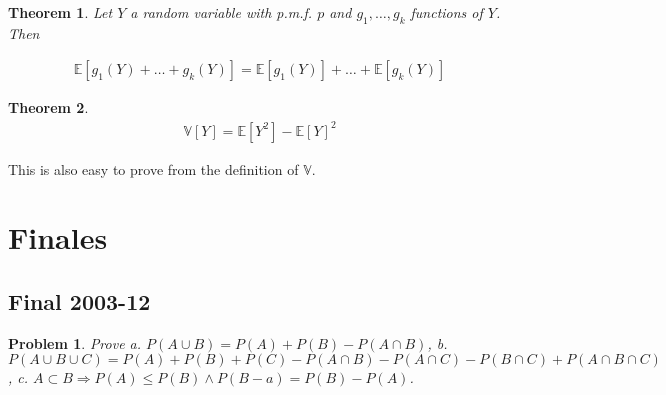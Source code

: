 \documentclass[a4paper, 12pt]{article}
\newtheorem{problem}{Problem}
\newtheorem{theorem}{Theorem}
\newtheorem{problem}{Problem}
\newtheorem{theorem}{Theorem}
\begin{document}
\begin{theorem}
    Let $Y$ a random variable with p.m.f. $p$ and $g_1, \ldots, g_k$ functions
    of $Y$. Then 

    \begin{align*}
        \mathbb{E} \left[ g_1(Y) + \ldots + g_k(Y) \right] = \mathbb{E}\left[
        g_1(Y) \right] + \ldots + \mathbb{E}\left[ g_k(Y) \right] 
    \end{align*}
\end{theorem}

\begin{theorem}
    \begin{align*}
    \mathbb{V}[Y] = \mathbb{E}[Y^2] - \mathbb{E}[Y]^2
    \end{align*}
\end{theorem}

This is also easy to prove from the definition of $\mathbb{V}$. 

\pagebreak

\section{Finales}

\subsection{Final 2003-12}

\begin{problem}
    Prove \textit{a.} $P(A \cup B) = P(A) + P(B) - P(A \cap B)$, \textit{b.}
    $P(A \cup B \cup C) = P(A) + P(B) + P(C) - P(A \cap B) - P(A \cap C) - P(B
    \cap C) + P(A \cap B \cap C)$, \textit{c.} $A \subset B \Rightarrow P(A) \leq
    P(B) \land P(B - a) = P(B) - P(A)$.
\end{problem}
\end{document}
